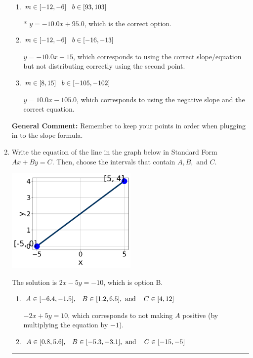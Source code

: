 \documentclass{extbook}[14pt]
\newcommand{\litem}[1]{\item #1

\rule{\textwidth}{0.4pt}}
\begin{document}
\begin{enumerate}
{\begin{enumerate}[label=\Alph*.]
 $y = -10.0x -95.0$, which corresponds to using the correct slope and getting the negative y-intercept.
\item \( m \in [-12, -6] \hspace*{3mm} b \in [93, 103] \)

* $y = -10.0x + 95.0$, which is the correct option.
\item \( m \in [-12, -6] \hspace*{3mm} b \in [-16, -13] \)

 $y = -10.0x -15$, which corresponds to using the correct slope/equation but not distributing correctly using the second point.
\item \( m \in [8, 15] \hspace*{3mm} b \in [-105, -102] \)

 $y = 10.0x -105.0$, which corresponds to using the negative slope and the correct equation.
\end{enumerate}

\textbf{General Comment:} Remember to keep your points in order when plugging in to the slope formula.
}
\litem{
Write the equation of the line in the graph below in Standard Form $Ax+By=C$. Then, choose the intervals that contain $A, B, \text{ and } C$.

\begin{center}
    \includegraphics[width=0.5\textwidth]{../Figures/linearGraphToStandardCopyB.png}
\end{center}


The solution is \( 2x - 5y = -10 \), which is option B.\begin{enumerate}[label=\Alph*.]
\item \( A \in [-6.4, -1.5], \hspace{3mm} B \in [1.2, 6.5], \text{ and } \hspace{3mm} C \in [4, 12] \)

 $-2x + 5y = 10$, which corresponds to not making $A$ positive (by multiplying the equation by $-1$).
\item \( A \in [0.8, 5.6], \hspace{3mm} B \in [-5.3, -3.1], \text{ and } \hspace{3mm} C \in [-15, -5] \)


\end{enumerate}}
\end{enumerate}
\end{document}
